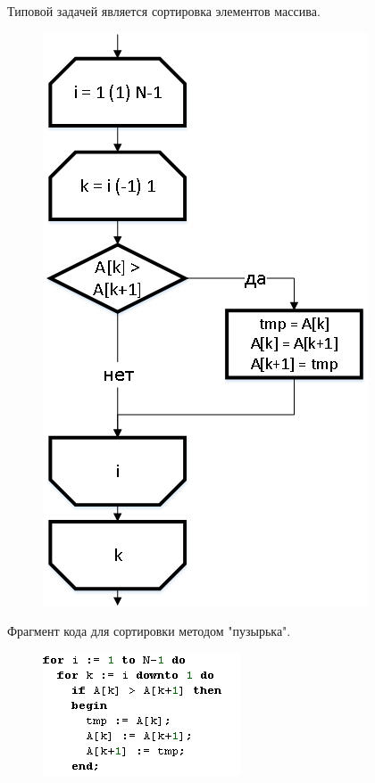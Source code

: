 \documentclass{beamer}
\begin{document}
\begin{frame}
Типовой задачей является сортировка элементов массива.
\begin{figure}[h]
\centering
\includegraphics[scale=0.4]{images/array_sort.png}
\label{pic-sort}
\end{figure}
\end{frame}

\begin{frame}
Фрагмент кода для сортировки методом "пузырька".
\begin{figure}[h]
\centering
\includegraphics[scale=1.0]{images/array_sort_code.png}
\label{pic-sort}
\end{figure}
\end{frame}
\end{document}
